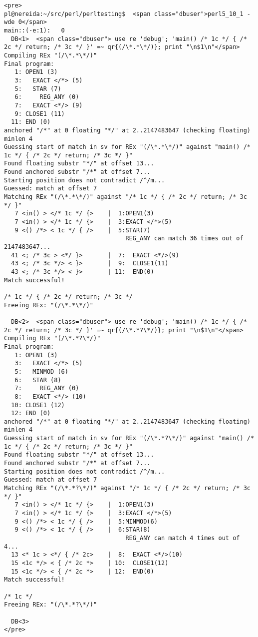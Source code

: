 \begin{verbatim}
<pre>
pl@nereida:~/src/perl/perltesting$  <span class="dbuser">perl5_10_1 -wde 0</span>
main::(-e:1):   0
  DB<1>  <span class="dbuser"> use re 'debug'; 'main() /* 1c */ { /* 2c */ return; /* 3c */ }' =~ qr{(/\*.*\*/)}; print "\n$1\n"</span>
Compiling REx "(/\*.*\*/)"
Final program:
   1: OPEN1 (3)
   3:   EXACT </*> (5)
   5:   STAR (7)
   6:     REG_ANY (0)
   7:   EXACT <*/> (9)
   9: CLOSE1 (11)
  11: END (0)
anchored "/*" at 0 floating "*/" at 2..2147483647 (checking floating) minlen 4
Guessing start of match in sv for REx "(/\*.*\*/)" against "main() /* 1c */ { /* 2c */ return; /* 3c */ }"
Found floating substr "*/" at offset 13...
Found anchored substr "/*" at offset 7...
Starting position does not contradict /^/m...
Guessed: match at offset 7
Matching REx "(/\*.*\*/)" against "/* 1c */ { /* 2c */ return; /* 3c */ }"
   7 <in() > </* 1c */ {>    |  1:OPEN1(3)
   7 <in() > </* 1c */ {>    |  3:EXACT </*>(5)
   9 <() /*> < 1c */ { />    |  5:STAR(7)
                                  REG_ANY can match 36 times out of 2147483647...
  41 <; /* 3c > <*/ }>       |  7:  EXACT <*/>(9)
  43 <; /* 3c */> < }>       |  9:  CLOSE1(11)
  43 <; /* 3c */> < }>       | 11:  END(0)
Match successful!

/* 1c */ { /* 2c */ return; /* 3c */
Freeing REx: "(/\*.*\*/)"

  DB<2>  <span class="dbuser"> use re 'debug'; 'main() /* 1c */ { /* 2c */ return; /* 3c */ }' =~ qr{(/\*.*?\*/)}; print "\n$1\n"</span>
Compiling REx "(/\*.*?\*/)"
Final program:
   1: OPEN1 (3)
   3:   EXACT </*> (5)
   5:   MINMOD (6)
   6:   STAR (8)
   7:     REG_ANY (0)
   8:   EXACT <*/> (10)
  10: CLOSE1 (12)
  12: END (0)
anchored "/*" at 0 floating "*/" at 2..2147483647 (checking floating) minlen 4
Guessing start of match in sv for REx "(/\*.*?\*/)" against "main() /* 1c */ { /* 2c */ return; /* 3c */ }"
Found floating substr "*/" at offset 13...
Found anchored substr "/*" at offset 7...
Starting position does not contradict /^/m...
Guessed: match at offset 7
Matching REx "(/\*.*?\*/)" against "/* 1c */ { /* 2c */ return; /* 3c */ }"
   7 <in() > </* 1c */ {>    |  1:OPEN1(3)
   7 <in() > </* 1c */ {>    |  3:EXACT </*>(5)
   9 <() /*> < 1c */ { />    |  5:MINMOD(6)
   9 <() /*> < 1c */ { />    |  6:STAR(8)
                                  REG_ANY can match 4 times out of 4...
  13 <* 1c > <*/ { /* 2c>    |  8:  EXACT <*/>(10)
  15 <1c */> < { /* 2c *>    | 10:  CLOSE1(12)
  15 <1c */> < { /* 2c *>    | 12:  END(0)
Match successful!

/* 1c */
Freeing REx: "(/\*.*?\*/)"

  DB<3>
</pre>
\end{verbatim}

